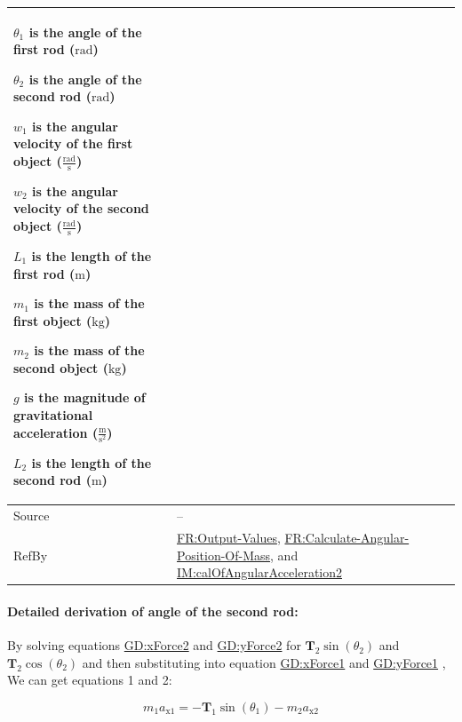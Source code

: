 \documentclass[12pt]{article}
\begin{document}
\begin{minipage}{\textwidth}
\begin{tabular}{>{\raggedright}p{}>{\raggedright\arraybackslash}p{}}
\begin{symbDescription}
              \item{${θ_{1}}$ is the angle of the first rod (${\text{rad}}$)}
              \item{${θ_{2}}$ is the angle of the second rod (${\text{rad}}$)}
              \item{${w_{1}}$ is the angular velocity of the first object ($\frac{\text{rad}}{\text{s}}$)}
              \item{${w_{2}}$ is the angular velocity of the second object ($\frac{\text{rad}}{\text{s}}$)}
              \item{${L_{1}}$ is the length of the first rod (${\text{m}}$)}
              \item{${m_{1}}$ is the mass of the first object (${\text{kg}}$)}
              \item{${m_{2}}$ is the mass of the second object (${\text{kg}}$)}
              \item{$g$ is the magnitude of gravitational acceleration ($\frac{\text{m}}{\text{s}^{2}}$)}
              \item{${L_{2}}$ is the length of the second rod (${\text{m}}$)}
              \end{symbDescription}
\\ \midrule
Source & --
         
\\ \midrule
RefBy & \hyperref[outputValues]{FR:Output-Values}, \hyperref[calcAngPos]{FR:Calculate-Angular-Position-Of-Mass}, and \hyperref[IM:calOfAngularAcceleration2]{IM:calOfAngularAcceleration2}
        
\\ \bottomrule
\end{tabular}
\end{minipage}

\paragraph{Detailed derivation of angle of the second rod:}
\label{IM:calOfAngularAcceleration2Deriv}
By solving equations \hyperref[GD:xForce2]{GD:xForce2} and \hyperref[GD:yForce2]{GD:yForce2} for ${\symbf{T}_{2}} \sin\left({θ_{2}}\right)$ and ${\symbf{T}_{2}} \cos\left({θ_{2}}\right)$ and then substituting into equation \hyperref[GD:xForce1]{GD:xForce1} and \hyperref[GD:yForce1]{GD:yForce1} , We can get equations 1 and 2:

\begin{displaymath}
{m_{1}} {a_{\text{x}1}}=-{\symbf{T}_{1}} \sin\left({θ_{1}}\right)-{m_{2}} {a_{\text{x}2}}
\end{displaymath}
\end{document}
